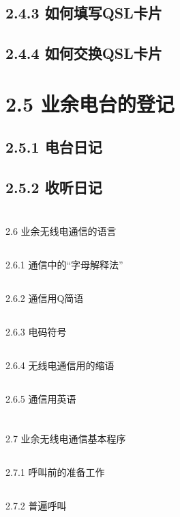 \documentclass[12pt,UTF8]{ctexbook}
\begin{document}
\subsection{2.4.3 如何填写QSL卡片}
\subsection{2.4.4 如何交换QSL卡片}
\section{2.5 业余电台的登记}
\subsection{2.5.1 电台日记}
\subsection{2.5.2 收听日记}
\section{}2.6 业余无线电通信的语言
\subsection{}2.6.1 通信中的“字母解释法”
\subsection{}2.6.2 通信用Q简语
\subsection{}2.6.3 电码符号
\subsection{}2.6.4 无线电通信用的缩语
\subsection{}2.6.5 通信用英语
\section{}2.7 业余无线电通信基本程序
\subsection{}2.7.1 呼叫前的准备工作
\subsection{}2.7.2 普遍呼叫
\end{document}
